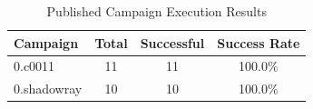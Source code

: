 \begin{table}[htbp]
\centering
\caption{Published Campaign Execution Results}
\label{tab:execution}
\begin{tabular}{lccc}
\toprule
Campaign & Total & Successful & Success Rate \\
\midrule
0.c0011 & 11 & 11 & 100.0\% \\
0.shadowray & 10 & 10 & 100.0\% \\
\bottomrule
\end{tabular}
\end{table}


